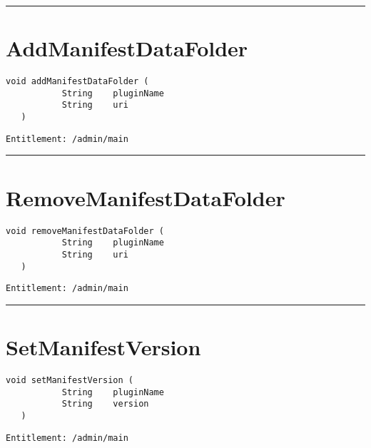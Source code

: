 \rule{12cm}{2pt}
\section{AddManifestDataFolder}
\label{Api:AddManifestDataFolder}
\begin{lstlisting}[style=nonumbers]
   void addManifestDataFolder (
           String    pluginName
           String    uri
   )
\end{lstlisting}
\begin{Verbatim}[formatcom=\color{Maroon}]
  Entitlement: /admin/main
\end{Verbatim}



\rule{12cm}{2pt}
\section{RemoveManifestDataFolder}
\label{Api:RemoveManifestDataFolder}
\begin{lstlisting}[style=nonumbers]
   void removeManifestDataFolder (
           String    pluginName
           String    uri
   )
\end{lstlisting}
\begin{Verbatim}[formatcom=\color{Maroon}]
  Entitlement: /admin/main
\end{Verbatim}



\rule{12cm}{2pt}
\section{SetManifestVersion}
\label{Api:SetManifestVersion}
\begin{lstlisting}[style=nonumbers]
   void setManifestVersion (
           String    pluginName
           String    version
   )
\end{lstlisting}
\begin{Verbatim}[formatcom=\color{Maroon}]
  Entitlement: /admin/main
\end{Verbatim}



